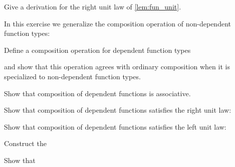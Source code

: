 \begin{exercises}
\item \label{ex:fun_right_unit}Give a derivation for the right unit law of \autoref{lem:fun_unit}.
\item In this exercise we generalize the composition operation of non-dependent function types:
\begin{subexenum}
\item Define a composition operation for dependent function types
\begin{prooftree}
\end{prooftree}
and show that this operation agrees with ordinary composition when it is specialized to non-dependent function types.
\item Show that composition of dependent functions is associative.
\item Show that composition of dependent functions satisfies the right unit law:
\begin{prooftree}
\end{prooftree}
\item Show that composition of dependent functions satisfies the left unit law:
\begin{prooftree}
\end{prooftree}
\end{subexenum}
\item 
\begin{subexenum}
\item Construct the 
\begin{prooftree}
\end{prooftree}
\item Show that
\begin{prooftree}

\end{prooftree}
\end{subexenum}
\end{exercises}

